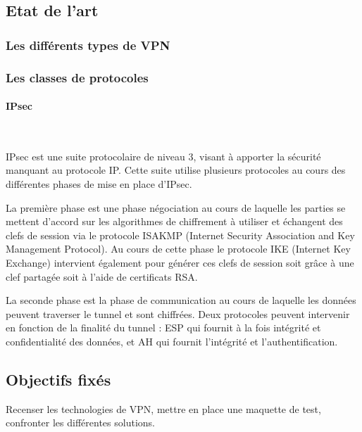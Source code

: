 \subsection{Etat de l'art}
\subsubsection{Les différents types de VPN}
\subsubsection{Les classes de protocoles}
\paragraph{IPsec}
~

IPsec est une suite protocolaire de niveau 3, visant à apporter la sécurité manquant au protocole IP. Cette suite utilise plusieurs protocoles au cours des différentes phases de mise en place d'IPsec.

La première phase est une phase négociation au cours de laquelle les parties se mettent d'accord sur les algorithmes de chiffrement à utiliser et échangent des clefs de session via le protocole ISAKMP (Internet Security Association and Key Management Protocol). Au cours de cette phase le protocole IKE (Internet Key Exchange) intervient également pour générer ces clefs de session soit grâce à une clef partagée soit à l'aide de certificats RSA.

La seconde phase est la phase de communication au cours de laquelle les données peuvent traverser le tunnel et sont chiffrées. Deux protocoles peuvent intervenir en fonction de la finalité du tunnel : ESP qui fournit à la fois intégrité et confidentialité des données, et AH qui fournit l'intégrité et l'authentification.




\subsection{Objectifs fixés}
Recenser les technologies de VPN, mettre en place une maquette de test, confronter les différentes solutions.

\pagebreak

